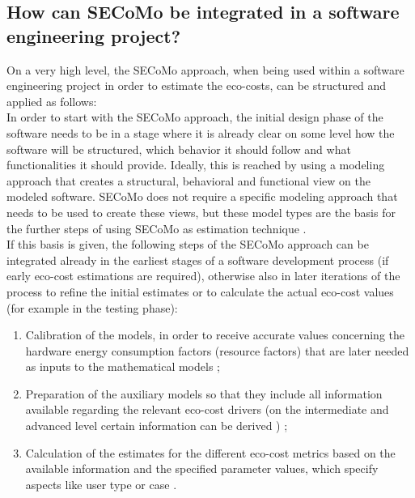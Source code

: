 \documentclass[oribibl]{llncs}
\begin{document}
\subsection{How can SECoMo be integrated in a software engineering project?}
On a very high level, the SECoMo approach, when being used within a software engineering project in order to estimate the eco-costs, can be structured and applied as follows:\\
In order to start with the SECoMo approach, the initial design phase of the software needs to be in a stage where it is already clear on some level how the software will be structured, which behavior it should follow and what functionalities it should provide. %
Ideally, this is reached by using a modeling approach that creates a structural, behavioral and functional view on the modeled software. SECoMo does not require a specific modeling approach that needs to be used to create these views, but these model types are the basis for the further steps of using SECoMo as estimation technique \cite{schulze_cost_2016}.\\
If this basis is given, the following steps of the SECoMo approach can be integrated already in the earliest stages of a software development process (if early eco-cost estimations are required), otherwise also in later iterations of the process to refine the initial estimates or to calculate the actual eco-cost values (for example in the testing phase):
\begin{enumerate}
	\item Calibration of the models, in order to receive accurate values concerning the hardware energy consumption factors (resource factors) that are later needed as inputs to the mathematical models \cite{schulze_cost_2016}; %
	\item Preparation of the auxiliary models so that they include all information available regarding the relevant eco-cost drivers (on the intermediate and advanced level certain information can be derived%
	) \cite{schulze_cost_2016}; %
	\item Calculation of the estimates for the different eco-cost metrics based on the available information %
	and the specified parameter values, which specify aspects like user type or case \cite{schulze_cost_2016}.
\end{enumerate}
\end{document}
